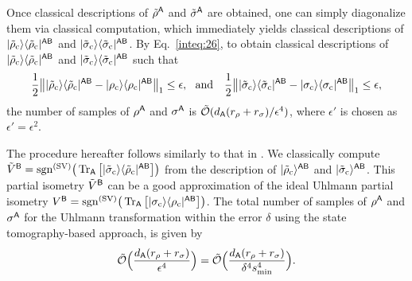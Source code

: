 Once classical descriptions of $\tilde{\rho}^{\mathsf{A}}$ and $\tilde{\sigma}^{\mathsf{A}}$ are obtained, one can simply diagonalize them via classical computation, which immediately yields classical descriptions of $|\tilde{\rho}_{\rm c}\rangle\langle\tilde{\rho}_{\rm c}|^{{\mathsf{A}}{\mathsf{B}}}$ and $|\tilde{\sigma}_{\rm c}\rangle\langle\tilde{\sigma}_{\rm c}|^{{\mathsf{A}}{\mathsf{B}}}$.
By Eq.~\eqref{inteq:26}, to obtain classical descriptions of $|\tilde{\rho}_{\rm c}\rangle\langle\tilde{\rho}_{\rm c}|^{{\mathsf{A}}{\mathsf{B}}}$ and $|\tilde{\sigma}_{\rm c}\rangle\langle\tilde{\sigma}_{\rm c}|^{{\mathsf{A}}{\mathsf{B}}}$ such that 
\begin{align}
    \f{1}{2}\big\|\ketbra{\til{\rho}_{\rm c}}{\til{\rho}_{\rm c}}^{\sA\sB} - \ketbra{\rho_{\rm c}}{\rho_{\rm c}}^{\sA\sB}\big\|_1 \leq \epsilon, \ \  \text{and} \ \ \ 
    \f{1}{2}\big\|\ketbra{\til{\sigma}_{\rm c}}{\til{\sigma}_{\rm c}}^{\sA\sB} - \ketbra{\sigma_{\rm c}}{\sigma_{\rm c}}^{\sA\sB}\big\|_1 \leq \epsilon,
\end{align}
the number of samples of $\rho^{\mathsf{A}}$ and $\sigma^{\mathsf{A}}$ is $\tilde{{\mathcal{O}}}(d_{\mathsf{A}} (r_\rho + r_\sigma) / \epsilon^4)$, where $\epsilon'$ is chosen as $\epsilon' = \epsilon^2$.



The procedure hereafter follows similarly to that in .
We classically compute $\tilde{V}^{{\mathsf{B}}} = \mathrm{sgn}^{(\rm SV)}\big(\operatorname{Tr}_{\mathsf{A}}\big[|\tilde{\sigma}_{\rm c}\rangle\langle\tilde{\rho}_{\rm c}|^{{\mathsf{A}}{\mathsf{B}}}\big]\big)$ from the description of $|\tilde{\rho}_{\rm c}\rangle^{{\mathsf{A}}{\mathsf{B}}}$ and $|\tilde{\sigma}_{\rm c}\rangle^{{\mathsf{A}}{\mathsf{B}}}$. This partial isometry $\tilde{V}^{{\mathsf{B}}}$ can be a good approximation of the ideal Uhlmann partial isometry $V^{{\mathsf{B}}} = \mathrm{sgn}^{(\rm SV)}\big(\operatorname{Tr}_{\mathsf{A}}\big[|\sigma_{\rm c}\rangle\langle\rho_{\rm c}|^{{\mathsf{A}}{\mathsf{B}}}\big]\big)$.
The total number of samples of $\rho^{\mathsf{A}}$ and $\sigma^{\mathsf{A}}$ for the Uhlmann transformation within the error $\delta$ using the state tomography-based approach, is given by 
\begin{align}
    \tilde{{\mathcal{O}}}\Big(\frac{d_{\mathsf{A}} (r_\rho + r_\sigma)}{\epsilon^4}\Big) 
    \label{eq:tomobase sample mixed}
    = \tilde{{\mathcal{O}}}\Big(\frac{d_{\mathsf{A}} (r_\rho + r_\sigma)}{\delta^4 s_{\rm min}^4}\Big).
\end{align}



